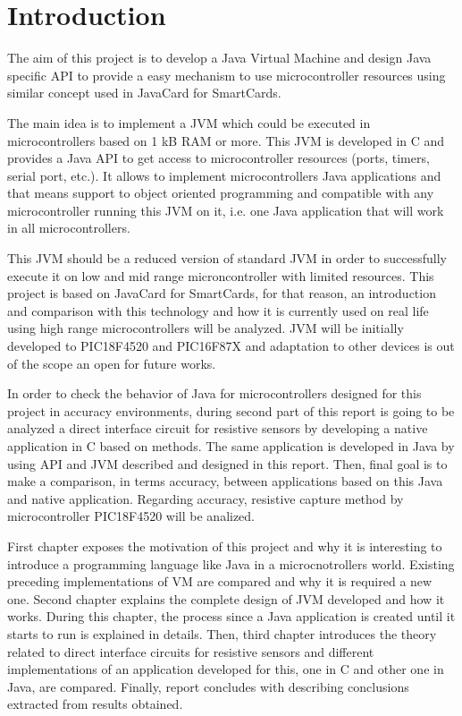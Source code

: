 \chapter{Introduction}\label{C:Introduction}
The aim of this project is to develop a Java Virtual Machine and design Java specific API to provide a easy mechanism to use microcontroller resources using similar concept used in JavaCard for SmartCards.

The main idea is to implement a JVM which could be executed in microcontrollers based on 1 kB RAM or more. This JVM is developed in C and provides a Java API to get access to microcontroller resources (ports, timers, serial port, etc.). It allows to implement microcontrollers Java applications and that means support to object oriented programming and compatible with any microcontroller running this JVM on it, i.e. one Java application that will work in all microcontrollers.

This JVM should be a reduced version of standard JVM in order to successfully execute it on low and mid range microncontroller with limited resources. This project is based on JavaCard for SmartCards, for that reason, an introduction and comparison with this technology and how it is currently used on real life using high range microcontrollers will be analyzed. JVM will be initially developed to PIC18F4520 and PIC16F87X and adaptation to other devices is out of the scope an open for future works.

In order to check the behavior of Java for microcontrollers designed for this project in accuracy environments, during second part of this report is going to be analyzed a direct interface circuit for resistive sensors by developing a native application in C based on \cite{Art:Accuracy} methods. The same application is developed in Java by using API and JVM described and designed in this report. Then, final goal is to make a comparison, in terms accuracy, between applications based on this Java and native application. Regarding accuracy, resistive capture method by microcontroller PIC18F4520 will be analized.

First chapter exposes the motivation of this project and why it is interesting to introduce a programming language like Java in a microcnotrollers world. Existing preceding implementations of VM are compared and why it is required a new one. Second chapter explains the complete design of JVM developed and how it works. During this chapter, the process since a Java application is created until it starts to run is explained in details. Then, third chapter introduces the theory related to direct interface circuits for resistive sensors and different implementations of an application developed for this, one in C and other one in Java, are compared. Finally, report concludes with describing conclusions extracted from results obtained.
